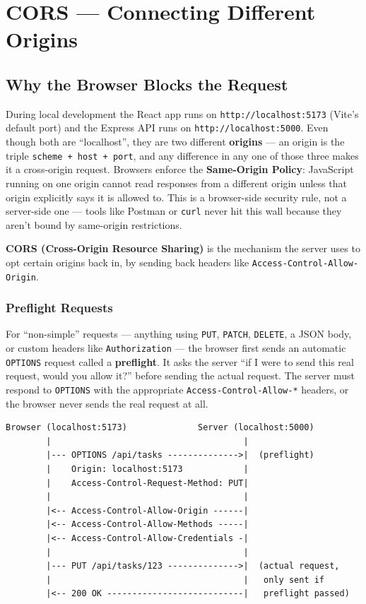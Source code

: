 \chapter{CORS --- Connecting Different Origins}

\section{Why the Browser Blocks the Request}

During local development the React app runs on
\texttt{http://localhost:5173} (Vite's default port) and the Express API runs
on \texttt{http://localhost:5000}. Even though both are ``localhost'', they
are two different \textbf{origins} --- an origin is the triple
\texttt{scheme + host + port}, and any difference in any one of those three
makes it a cross-origin request. Browsers enforce the
\textbf{Same-Origin Policy}: JavaScript running on one origin cannot read
responses from a different origin unless that origin explicitly says it is
allowed to. This is a browser-side security rule, not a server-side one ---
tools like Postman or \texttt{curl} never hit this wall because they aren't
bound by same-origin restrictions.

\textbf{CORS (Cross-Origin Resource Sharing)} is the mechanism the server uses
to opt certain origins back in, by sending back headers like
\texttt{Access-Control-Allow-Origin}.

\subsection{Preflight Requests}

For ``non-simple'' requests --- anything using \texttt{PUT}, \texttt{PATCH},
\texttt{DELETE}, a JSON body, or custom headers like
\texttt{Authorization} --- the browser first sends an automatic
\texttt{OPTIONS} request called a \textbf{preflight}. It asks the server
``if I were to send this real request, would you allow it?'' before sending
the actual request. The server must respond to \texttt{OPTIONS} with the
appropriate \texttt{Access-Control-Allow-*} headers, or the browser never
sends the real request at all.

\begin{diagrambox}
\begin{verbatim}
Browser (localhost:5173)              Server (localhost:5000)
        |                                      |
        |--- OPTIONS /api/tasks -------------->|  (preflight)
        |    Origin: localhost:5173            |
        |    Access-Control-Request-Method: PUT|
        |                                      |
        |<-- Access-Control-Allow-Origin ------|
        |<-- Access-Control-Allow-Methods -----|
        |<-- Access-Control-Allow-Credentials -|
        |                                      |
        |--- PUT /api/tasks/123 -------------->|  (actual request,
        |                                      |   only sent if
        |<-- 200 OK ---------------------------|   preflight passed)
\end{verbatim}
\end{diagrambox}

